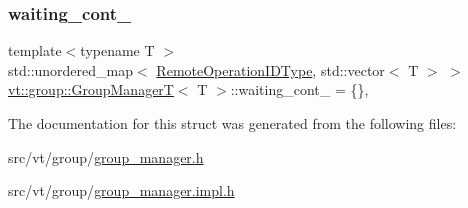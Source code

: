 \subsubsection{\texorpdfstring{waiting\+\_\+cont\+\_\+}{waiting\_cont\_}}
{\footnotesize\ttfamily template$<$typename T $>$ \\
std\+::unordered\+\_\+map$<$ \hyperlink{namespacevt_1_1group_a73f2624ddeb535b39a08b6524f26b244}{Remote\+Operation\+I\+D\+Type}, std\+::vector$<$ T $>$ $>$ \hyperlink{structvt_1_1group_1_1_group_manager_t}{vt\+::group\+::\+Group\+ManagerT}$<$ T $>$\+::waiting\+\_\+cont\+\_\+ = \{\}\hspace{0.3cm}{\ttfamily [static]}, {\ttfamily [private]}}



The documentation for this struct was generated from the following files\+:\begin{DoxyCompactItemize}
\item 
src/vt/group/\hyperlink{group__manager_8h}{group\+\_\+manager.\+h}\item 
src/vt/group/\hyperlink{group__manager_8impl_8h}{group\+\_\+manager.\+impl.\+h}\end{DoxyCompactItemize}
